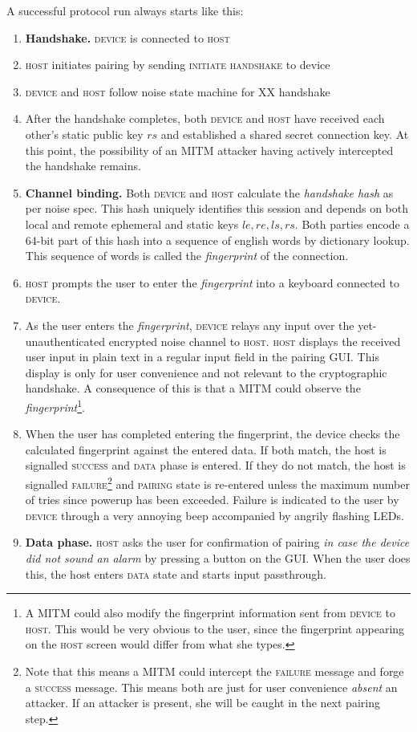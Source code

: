 \documentclass[12pt,a4paper,notitlepage]{article}
\begin{document}
A successful protocol run always starts like this:
\begin{enumerate}
\item \textbf{Handshake.} \textsc{device} is connected to \textsc{host}
\item \textsc{host} initiates pairing by sending \textsc{initiate handshake} to device
\item \textsc{device} and \textsc{host} follow noise state machine for \textsc{XX} handshake
\item After the handshake completes, both \textsc{device} and \textsc{host} have received each other's static public key
	$rs$ and established a shared secret connection key. At this point, the possibility of an MITM attacker having
	actively intercepted the handshake remains.
\item \textbf{Channel binding.} Both \textsc{device} and \textsc{host} calculate the \emph{handshake hash} as per noise spec\cite{perrin01}. This
	hash uniquely identifies this session and depends on both local and remote ephemeral and static keys $le, re, ls,
	rs$.  Both parties encode a 64-bit part of this hash into a sequence of english words by dictionary lookup. This
	sequence of words is called the \emph{fingerprint} of the connection.
\item \textsc{host} prompts the user to enter the \emph{fingerprint} into a keyboard connected to \textsc{device}.
\item As the user enters the \emph{fingerprint}, \textsc{device} relays any input over the yet-unauthenticated encrypted
	noise channel to \textsc{host}. \textsc{host} displays the received user input in plain text in a regular input
	field in the pairing GUI. This display is only for user convenience and not relevant to the cryptographic handshake.
	A consequence of this is that a MITM could observe the \emph{fingerprint}\footnote{
		A MITM could also modify the fingerprint information sent from \textsc{device} to \textsc{host}. This would be
		very obvious to the user, since the fingerprint appearing on the \textsc{host} screen would differ from what she
		types.
	}.
\item When the user has completed entering the fingerprint, the device checks the calculated fingerprint against the
	entered data. If both match, the host is signalled \textsc{success} and \textsc{data} phase is entered. If they do
	not match, the host is signalled \textsc{failure}\footnote{
		Note that this means a MITM could intercept the \textsc{failure} message and forge a \textsc{success} message.
		This means both are just for user convenience \emph{absent} an attacker. If an attacker is present, she will be
		caught in the next pairing step.
	} and \textsc{pairing} state is re-entered unless the maximum number of tries since powerup has been exceeded.
	Failure is indicated to the user by \textsc{device} through a very annoying beep accompanied by angrily flashing
	LEDs.
\item \textbf{Data phase.} \textsc{host} asks the user for confirmation of pairing \emph{in case the device did not sound an alarm} by
	pressing a button on the GUI. When the user does this, the host enters \textsc{data} state and starts input
	passthrough.
\end{enumerate}
\end{document}

